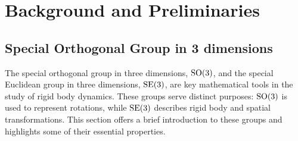 \chapter{Background and {Preliminaries}}
\label{sec:background}

\section{Special Orthogonal Group in 3 dimensions}
\label{sec:bp:so3_se3}

The special orthogonal group in three dimensions, $\operatorname{SO}(3)$, and the special
Euclidean group in three dimensions, $\operatorname{SE}(3)$, are key mathematical tools in the
study of rigid body dynamics. These groups serve distinct purposes: $\operatorname{SO}(3)$ is
used to represent rotations, while $\operatorname{SE}(3)$ describes rigid body and spatial
transformations. This section offers a brief introduction to these groups and
highlights some of their essential properties.

